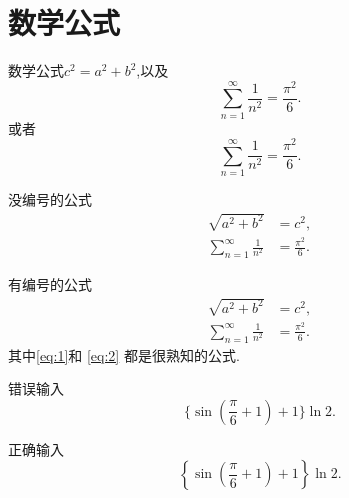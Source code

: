 \newpage
\section{数学公式}
数学公式$c^2=a^2+b^2$,以及
$$\sum_{n=1}^\infty \frac1{n^2}=\frac{\pi^2}6.$$
或者
\[\sum_{n=1}^\infty \frac1{n^2}=\frac{\pi^2}6.\]

没编号的公式
\begin{align*}
\sqrt{a^2 + b^2} &= c^2,\\
\sum_{n=1}^\infty \frac1{n^2}&=\frac{\pi^2}6.
\end{align*}

有编号的公式
\begin{align}\label{eq:1}
\sqrt{a^2 + b^2} &= c^2,\\
\sum_{n=1}^\infty \frac1{n^2}&=\frac{\pi^2}6.\label{eq:2}
\end{align}
其中\eqref{eq:1}和 \ref{eq:2} 都是很熟知的公式.

错误输入
\[
\{\sin(\frac{\pi}{6}+1)+1\}\ln 2.
\]

正确输入
\[
\left\{\sin\left(\frac{\pi}{6}+1\right)+1\right\}\ln 2.
\]
